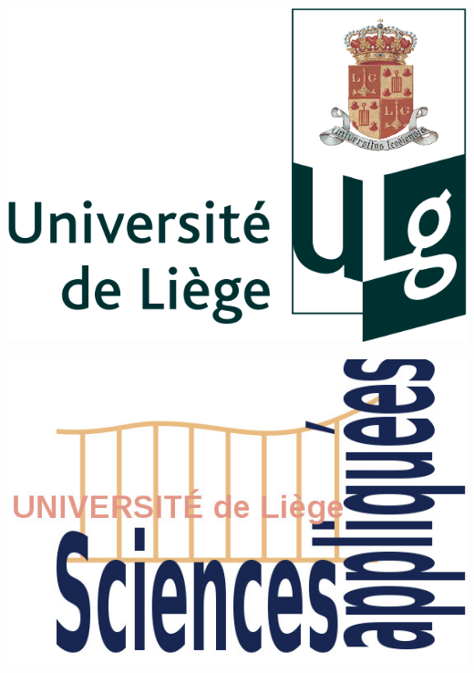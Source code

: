 \begin{titlepage}
\begin{center}
   \begin{minipage}[c]{.46\linewidth}
\includegraphics[scale=0.2]{Images/logoULg.png}
   \end{minipage} \hfill
   \begin{minipage}[c]{.46\linewidth}
\includegraphics[scale=0.4]{Images/fsa.jpg}
   \end{minipage}


\end{center}
\end{titlepage}
